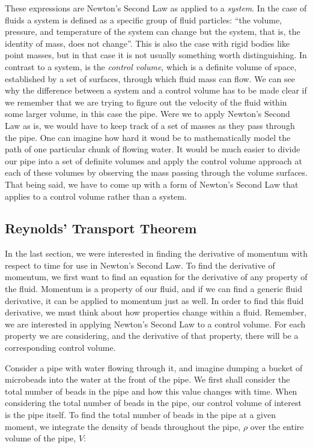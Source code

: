 \documentclass[twocolumn,12pth]{article}
\begin{document}
These expressions are Newton's Second Law as applied to a \textit{system}.
In the case of fluids a system is defined as a specific group of fluid particles: ``the volume, pressure, and temperature of the system can change but the system, that is, the identity of mass, does not change''. \cite{Granger1995}
This is also the case with rigid bodies like point masses, but in that case it is not usually something worth distinguishing.
In contrast to a system, is the \textit{control volume}, which is a definite volume of space, established by a set of surfaces, through which fluid mass can flow.
We can see why the difference between a system and a control volume has to be made clear if we remember that we are trying to figure out the velocity of the fluid within some larger volume, in this case the pipe.
Were we to apply Newton's Second Law as is, we would have to keep track of a set of masses as they pass through the pipe.
One can imagine how hard it woud be to mathematically model the path of one particular chunk of flowing water.
It would be much easier to divide our pipe into a set of definite volumes and apply the control volume approach at each of these volumes by observing the mass passing through the volume surfaces.
That being said, we have to come up with a form of Newton's Second Law that applies to a control volume rather than a system.

\subsection{Reynolds' Transport Theorem}

In the last section, we were interested in finding the derivative of momentum with respect to time for use in Newton's Second Law.
To find the derivative of momentum, we first want to find an equation for the derivative of any property of the fluid.
Momentum is a property of our fluid, and if we can find a generic fluid derivative, it can be applied to momentum just as well.
In order to find this fluid derivative, we must think about how properties change within a fluid.
Remember, we are interested in applying Newton's Second Law to a control volume.
For each property we are considering, and the derivative of that property, there will be a corresponding control volume.

Consider a pipe with water flowing through it, and imagine dumping a bucket of microbeads into the water at the front of the pipe.
We first shall consider the total number of beads in the pipe and how this value changes with time.
When considering the total number of beads in the pipe, our control volume of interest is the pipe itself.
To find the total number of beads in the pipe at a given moment, we integrate the density of beads throughout the pipe, $\rho$ over the entire volume of the pipe, $V$:
\end{document}
